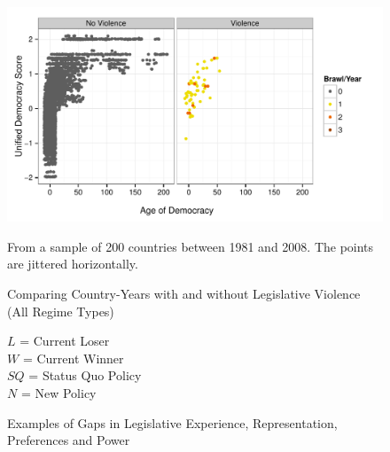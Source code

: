 \documentclass[a4paper]{article}\usepackage{graphicx, color}
\newenvironment{knitrout}{}{} %
\begin{document}
\begin{figure}
    \caption{Comparing Country-Years with and without Legislative Violence (All Regime Types)}
    \label{UDSAgeScatter}
    \begin{center}

\begin{knitrout}
\color{fgcolor}
\includegraphics[width=0.8\linewidth]{figure/ScatterDem} 

\end{knitrout}


  \end{center}
    \begin{singlespace}
        {\scriptsize{From a sample of 200 countries between 1981 and 2008. The points are jittered horizontally.}}
    \end{singlespace}
\end{figure}

\begin{figure}[h!]
    \caption{Examples of Gaps in Legislative Experience, Representation, Preferences and Power}
    \label{example_gaps}
    \begin{center}

        

    \end{center}
        \begin{singlespace}
        {\scriptsize{$L$ = Current Loser \\
                        $W$ = Current Winner \\
                        $SQ$ = Status Quo Policy \\
                        $N$ = New Policy
                    }}
    \end{singlespace}

\end{figure}
\end{document}
